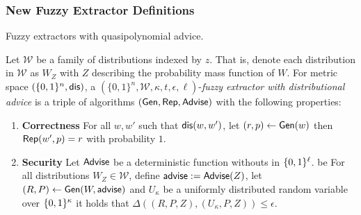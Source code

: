     

\subsubsection{New Fuzzy Extractor Definitions}
Fuzzy extractors with quasipolynomial advice. 

\begin{definition}
\label{def:fe distributional}
Let $\mathcal{W}$ be a family of distributions indexed by $z$.  That is, denote each distribution in $\mathcal{W}$ as $W_Z$ with $Z$ describing the probability mass function of $W$.  
For metric space $(\{0,1\}^n, \mathsf{dis})$, a $(\{0,1\}^n, \mathcal{W}, \kappa, t, \epsilon, \ell)$-\emph{fuzzy extractor with distributional advice} is a triple of algorithms $({\mathsf{Gen}}, {\mathsf{Rep}}, {\mathsf{Advise}})$ with the following properties:
\begin{enumerate} 
\itemsep0em
\item \textbf{Correctness} For all $w, w'$ such that $\mathsf{dis}(w, w')$, let $(r, p) \leftarrow {\ensuremath{\mathsf{Gen}}}(w)$ then ${\mathsf{Rep}}(w', p) = r$ with probability $1$. 
\item \textbf{Security} Let ${\mathsf{Advise}}$ be a deterministic function withouts in $\{0, 1\}^\ell$.  be For all distributions $W_Z \in \mathcal{W}$, define ${\mathsf{advise}}:= {\mathsf{Advise}}(Z)$, let $(R, P) \leftarrow {\ensuremath{\mathsf{Gen}}}(W, {\mathsf{advise}})$ and $U_\kappa$ be a uniformly distributed random variable over $\{0, 1\}^\kappa$ it holds that $\Delta((R, P, Z), (U_\kappa, P, Z))\le \epsilon.$
\end{enumerate}
\end{definition}


